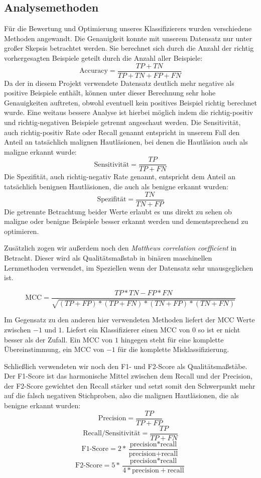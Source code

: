 \subsection{Analysemethoden}

Für die Bewertung und Optimierung unseres Klassifizierers wurden verschiedene Methoden angewandt. Die Genauigkeit konnte mit unserem Datensatz nur unter großer Skepsis betrachtet werden. Sie berechnet sich durch die Anzahl der richtig vorhergesagten Beispiele geteilt durch die Anzahl aller Beispiele:
	\[\text{Accuracy} = \frac{TP+TN}{TP+TN+FP+FN}\]
Da der in diesem Projekt verwendete Datensatz deutlich mehr negative als positive Beispiele enthält, können unter dieser Berechnung sehr hohe Genauigkeiten auftreten, obwohl eventuell kein positives Beispiel richtig berechnet wurde. Eine weitaus bessere Analyse ist hierbei möglich indem die richtig-positiv und richtig-negativen Beispiele getrennt angeschaut werden. Die Sensitivität, auch richtig-positiv Rate oder Recall genannt entspricht in unserem Fall den Anteil an tatsächlich malignen Hautläsionen, bei denen die Hautläsion auch als maligne erkannt wurde: 
\[\text{Sensitivität} = \frac{TP}{TP+FN}\]
Die Spezifität, auch richtig-negativ Rate genannt, entspricht dem Anteil an tatsächlich benignen Hautläsionen, die auch als benigne erkannt wurden:
\[\text{Spezifität} = \frac{TN}{TN+FP}\]
Die getrennte Betrachtung beider Werte erlaubt es uns direkt zu sehen ob maligne oder benigne Beispiele besser erkannt werden und dementsprechend zu optimieren.

Zusätzlich zogen wir außerdem noch den \textit{Matthews correlation coefficient} in Betracht. Dieser wird als Qualitätsmaßstab in binären maschinellen Lernmethoden verwendet, im Speziellen wenn der Datensatz sehr unausgeglichen ist. 

\[\text{MCC} = \frac{TP*TN - FP*FN}{\sqrt{(TP+FP)*(TP+FN)*(TN+FP)*(TN+FN)}}\]

Im Gegensatz zu den anderen hier verwendeten Methoden liefert der MCC Werte zwischen $-1$ und $1$. Liefert ein Klassifizierer einen MCC von $0$ so ist er nicht besser als der Zufall. Ein MCC von $1$ hingegen steht für eine komplette Übereinstimmung, ein MCC von $-1$ für die komplette Misklassifizierung.

Schließlich verwendeten wir noch den F1- und F2-Score als Qualitätsmaßstäbe. Der F1-Score ist das harmonische Mittel zwischen dem Recall und der Precision, der F2-Score gewichtet den Recall stärker und setzt somit den Schwerpunkt mehr auf die falsch negativen Stichproben, also die malignen Hautläsionen, die als benigne erkannt wurden:
	\[\text{Precision} = \frac{TP}{TP+FP}\]
    \[\text{Recall/Sensitivität} = \frac{TP}{TP+FN}\]
	\[\text{F1-Score} = 2*\frac{\text{precision}*\text{recall}}	{\text{precision}+\text{recall}}\]
   	\[\text{F2-Score} = 5*\frac{\text{precision}*\text{recall}}	{4*\text{precision}+\text{recall}}\]
    
